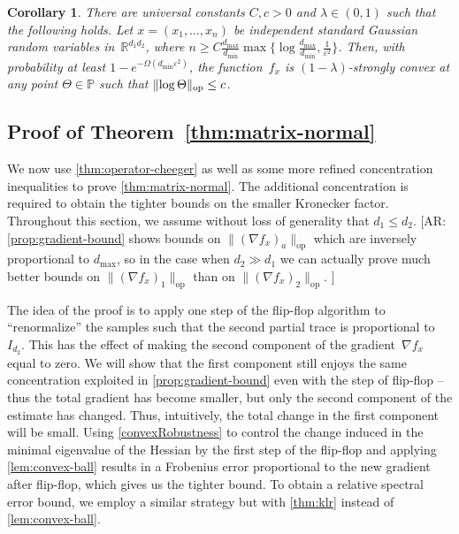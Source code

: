 \documentclass[aos]{imsart}
\newtheorem{corollary}[theorem]{Corollary}
\theoremstyle{definition}
\numberwithin{equation}{section}
\DeclareMathOperator{\op}{op}
\DeclarePairedDelimiter{\norm}{\lVert}{\rVert}
\newcommand{\R}{{\mathbb{R}}}
\renewcommand{\P}{{\mathbb{P}}}
\newcommand{\eps}{\varepsilon}
\newcommand{\samp}{x}
\newcommand{\AR}[1]{{\color{orange}[AR: #1]}}
\begin{document}
\begin{corollary}\label{cor:matrix-convexity}
There are universal constants $C, c > 0$ and $\lambda\in(0,1)$ such that the following holds.
Let $x=(x_1,\dots,x_n)$ be independent standard Gaussian random variables in~$\R^{d_1d_2}$, where $n \geq C \frac{d_{\max}}{d_{\min}} \max\{\log \frac{d_{\max}}{d_{\min}}, \frac1{\eps^2} \}$.
Then, with probability at least $1 - e^{ - \Omega( d_{\min} \eps^2)}$, the function~$f_x$ is $(1-\lambda)$-strongly convex at any point $\Theta\in\P$ such that $\norm{\log\Theta}_{\op} \leq c$.
\end{corollary}



\subsection{Proof of Theorem~\ref{thm:matrix-normal}}
We now use \cref{thm:operator-cheeger} as well as some more refined concentration inequalities to prove \cref{thm:matrix-normal}.
The additional concentration is required to obtain the tighter bounds on the smaller Kronecker factor.
Throughout this section, we assume without loss of generality that $d_1 \leq d_2$. 
\AR{\cref{prop:gradient-bound} shows bounds on $\|(\nabla f_\samp)_{a}\|_{\op} $ which are inversely proportional to $d_{\max}$, so in the case when $d_{2} \gg d_{1}$ we can actually prove much better bounds on  $\|(\nabla f_\samp)_{1}\|_{\op}$ than on $\|(\nabla f_\samp)_{2}\|_{\op}$. }

The idea of the proof is to apply one step of the flip-flop algorithm to ``renormalize'' the samples such that the second partial trace is proportional to $I_{d_2}$.
This has the effect of making the second component of the gradient~$\nabla f_\samp$ equal to zero.
We will show that the first component still enjoys the same concentration exploited in \cref{prop:gradient-bound} even with the step of flip-flop -- thus the total gradient has become smaller, but only the second component of the estimate has changed.
Thus, intuitively, the total change in the first component will be small.
Using \cref{convexRobustness} to control the change induced in the minimal eigenvalue of the Hessian by the first step of the flip-flop and applying \cref{lem:convex-ball} results in a Frobenius error proportional to the new gradient after flip-flop, which gives us the tighter bound.
To obtain a relative spectral error bound, we employ a similar strategy but with \cref{thm:klr} instead of \cref{lem:convex-ball}.
\end{document}
